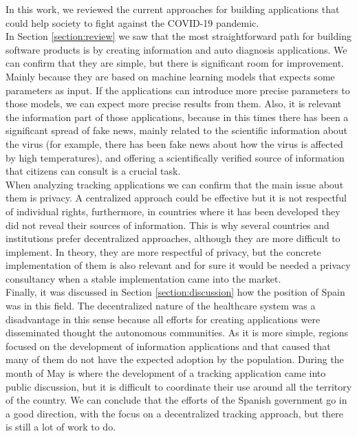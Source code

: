 \documentclass[a4paper, 12pt]{article}
\begin{document}
In this work, we reviewed the current approaches for building applications that could help society to fight against the COVID-19 pandemic.\\

In Section \ref{section:review} we saw that the most straightforward path for building software products is by creating information and auto diagnosis applications. We can confirm that they are simple, but there is significant room for improvement. Mainly because they are based on machine learning models that expects some parameters as input. If the applications can introduce more precise parameters to those models, we can expect more precise results from them. Also, it is relevant the information part of those applications, because in this times there has been a significant spread of fake news, mainly related to the scientific information about the virus (for example, there has been fake news about how the virus is affected by high temperatures), and offering a scientifically verified source of information that citizens can consult is a crucial task.\\

When analyzing tracking applications we can confirm that the main issue about them is privacy. A centralized approach could be effective but it is not respectful of individual rights, furthermore, in countries where it has been developed they did not reveal their sources of information. This is why several countries and institutions prefer decentralized approaches, although they are more difficult to implement. In theory, they are more respectful of privacy, but the concrete implementation of them is also relevant and for sure it would be needed a privacy consultancy when a stable implementation came into the market. \\

Finally, it was discussed in Section \ref{section:discussion} how the position of Spain was in this field. The decentralized nature of the healthcare system was a disadvantage in this sense because all efforts for creating applications were disseminated thought the autonomous communities. As it is more simple, regions focused on the development of information applications and that caused that many of them do not have the expected adoption by the population. During the month of May is where the development of a tracking application came into public discussion, but it is difficult to coordinate their use around all the territory of the country. We can conclude that the efforts of the Spanish government go in a good direction, with the focus on a decentralized tracking approach, but there is still a lot of work to do.





\nocite{*}
\end{document}
